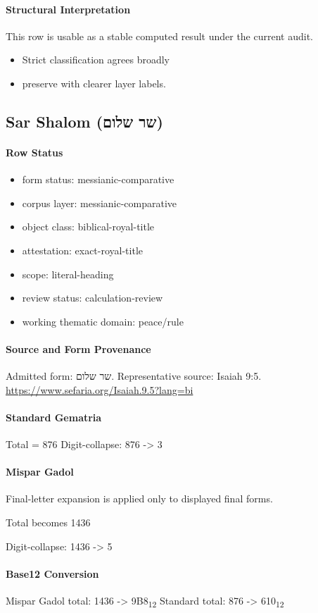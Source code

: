 \paragraph{Structural Interpretation}
This row is usable as a stable computed result under the current audit.

\begin{itemize}
\item Strict classification agrees broadly
\item preserve with clearer layer labels.
\end{itemize}

\subsection{Sar Shalom (שר שלום)}
\paragraph{Row Status}
\begin{itemize}
\item form status: messianic-comparative
\item corpus layer: messianic-comparative
\item object class: biblical-royal-title
\item attestation: exact-royal-title
\item scope: literal-heading
\item review status: calculation-review
\item working thematic domain: peace/rule
\end{itemize}
\paragraph{Source and Form Provenance}
Admitted form: שר שלום.
Representative source: Isaiah 9:5.
\url{https://www.sefaria.org/Isaiah.9.5?lang=bi}
\paragraph{Standard Gematria}
Total = 876
Digit-collapse: 876 -> 3
\paragraph{Mispar Gadol}
Final-letter expansion is applied only to displayed final forms.

Total becomes 1436

Digit-collapse: 1436 -> 5
\paragraph{Base12 Conversion}
Mispar Gadol total: 1436 -> 9B8\textsubscript{12}
Standard total: 876 -> 610\textsubscript{12}
